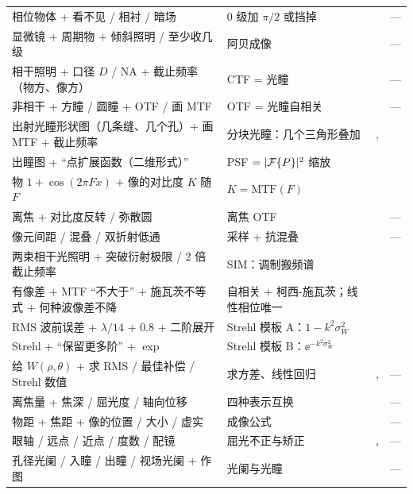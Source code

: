 {\begin{longtable}{@{}P{5.9cm}P{5.1cm}P{2.9cm}P{2.1cm}@{}}
相位物体 + 看不见 / 相衬 / 暗场 & 0 级加 $\pi/2$ 或挡掉 & \pageref{sec:phasecontrast} & —\\
显微镜 + 周期物 + 倾斜照明 / 至少收几级 & 阿贝成像 & \pageref{sec:abbe} & —\\
相干照明 + 口径 $D$ / NA + 截止频率（物方、像方） & CTF = 光瞳 & \pageref{sec:typeA} & —\\
非相干 + 方瞳 / 圆瞳 + OTF / 画 MTF & OTF = 光瞳自相关 & \pageref{sec:typeB} & —\\
出射光瞳形状图（几条缝、几个孔）+ 画 MTF + 截止频率 & 分块光瞳：几个三角形叠加 & \pageref{sec:typeC}, \pageref{ex:3slit} & \pageref{ex:v-3slit}\\
出瞳图 + “点扩展函数（二维形式）” & PSF $=|\mathcal{F}\{P\}|^2$ 缩放 & \pageref{sec:typeD} & \pageref{ex:v-3slit}\\
物 $1+\cos(2\pi Fx)$ + 像的对比度 $K$ 随 $F$ & $K=\mathrm{MTF}(F)$ & \pageref{sec:typeE} & \pageref{ex:v-3slit}\\
离焦 + 对比度反转 / 弥散圆 & 离焦 OTF & \pageref{sec:typeG} & —\\
像元间距 / 混叠 / 双折射低通 & 采样 + 抗混叠 & \pageref{sec:typeF} & —\\
两束相干光照明 + 突破衍射极限 / 2 倍截止频率 & SIM：调制搬频谱 & \pageref{sec:sim} & \pageref{ex:v-sim}\\
有像差 + MTF “不大于” + 施瓦茨不等式 + 何种波像差不降 & 自相关 + 柯西-施瓦茨；线性相位唯一 & \pageref{sec:mtfproof} & \pageref{ex:v-mtf}\\
RMS 波前误差 + $\lambda/14$ + 0.8 + 二阶展开 & Strehl 模板 A：$1-k^2\sigma_W^2$ & \pageref{ex:strehl-tplA} & \pageref{ex:v-strehl}\\
Strehl + “保留更多阶” + $\exp$ & Strehl 模板 B：$\ee^{-k^2\sigma_W^2}$ & \pageref{ex:strehl-tplB} & \pageref{ex:v-strehl2}\\
给 $W(\rho,\theta)$ + 求 RMS / 最佳补偿 / Strehl 数值 & 求方差、线性回归 & \pageref{rc:rms}, \pageref{rc:balance} & —\\
离焦量 + 焦深 / 屈光度 / 轴向位移 & 四种表示互换 & \pageref{sec:defocus-units} & —\\
物距 + 焦距 + 像的位置 / 大小 / 虚实 & 成像公式 & \pageref{sec:lensimg} & —\\
眼轴 / 远点 / 近点 / 度数 / 配镜 & 屈光不正与矫正 & \pageref{sec:farpoint}, \pageref{sec:correct} & —\\
孔径光阑 / 入瞳 / 出瞳 / 视场光阑 + 作图 & 光阑与光瞳 & \pageref{sec:stops} & —\\

\end{longtable}}
